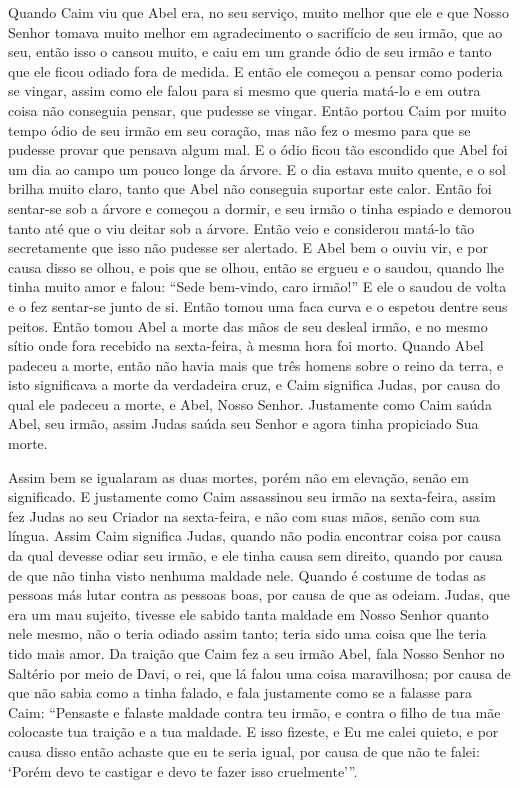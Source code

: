 Quando Caim viu que Abel era, no seu serviço, muito melhor que ele e que Nosso
Senhor tomava muito melhor em agradecimento o sacrifício de seu irmão, que ao
seu, então isso o cansou muito, e caiu em um grande ódio de seu irmão e tanto
que ele ficou odiado fora de medida. E então ele começou a pensar como poderia
se vingar, assim como ele falou para si mesmo que queria matá-lo e em outra
coisa não conseguia pensar, que pudesse se vingar. Então portou Caim por muito
tempo ódio de seu irmão em seu coração, mas não fez o mesmo para que se pudesse
provar que pensava algum mal. E o ódio ficou tão escondido que Abel foi um dia
ao campo um pouco longe da árvore. E o dia estava muito quente, e o sol brilha
muito claro, tanto que Abel não conseguia suportar este calor. Então foi
sentar-se sob a árvore e começou a dormir, e seu irmão o tinha espiado e
demorou tanto até que o viu deitar sob a árvore. Então veio e considerou
matá-lo tão secretamente que isso não pudesse ser alertado. E Abel bem o ouviu
vir, e por causa disso se olhou, e pois que se olhou, então se ergueu e o
saudou, quando lhe tinha muito amor e falou: “Sede bem-vindo, caro irmão!” E
ele o saudou de volta e o fez sentar-se junto de si. Então tomou uma faca curva
e o espetou dentre seus peitos. Então tomou Abel a morte das mãos de seu
desleal irmão, e no mesmo sítio onde fora recebido na sexta-feira, à mesma hora
foi morto. Quando Abel padeceu a morte, então não havia mais que três homens
sobre o reino da terra, e isto significava a morte da verdadeira cruz, e Caim
significa Judas, por causa do qual ele padeceu a morte, e Abel, Nosso Senhor.
Justamente como Caim saúda Abel, seu irmão, assim Judas saúda seu Senhor e
agora tinha propiciado Sua morte.

Assim bem se igualaram as duas mortes, porém não em elevação, senão em
significado. E justamente como Caim assassinou seu irmão na sexta-feira, assim
fez Judas ao seu Criador na sexta-feira, e não com suas mãos, senão com sua
língua. Assim Caim significa Judas, quando não podia encontrar coisa por causa
da qual devesse odiar seu irmão, e ele tinha causa sem direito, quando por
causa de que não tinha visto nenhuma maldade nele. Quando é costume de todas as
pessoas más lutar contra as pessoas boas, por causa de que as odeiam. Judas,
que era um mau sujeito, tivesse ele sabido tanta maldade em Nosso Senhor quanto
nele mesmo, não o teria odiado assim tanto; teria sido uma coisa que lhe teria
tido mais amor. Da traição que Caim fez a seu irmão Abel, fala Nosso Senhor no
Saltério por meio de Davi, o rei, que lá falou uma coisa maravilhosa; por causa
de que não sabia como a tinha falado, e fala justamente como se a falasse para
Caim: “Pensaste e falaste maldade contra teu irmão, e contra o filho de tua mãe
colocaste tua traição e a tua maldade. E isso fizeste, e Eu me calei quieto, e
por causa disso então achaste que eu te seria igual, por causa de que não te
falei: ‘Porém devo te castigar e devo te fazer isso cruelmente’”. 


